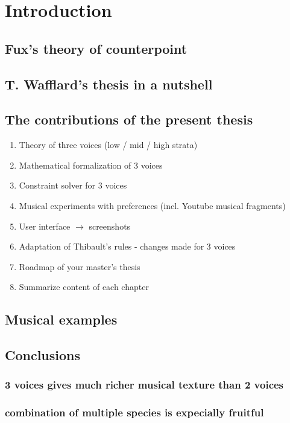 \chapter{Introduction}
\section{Fux's theory of counterpoint}
\section{T. Wafflard's thesis in a nutshell}
\section{The contributions of the present thesis}
\begin{enumerate}
    \item Theory of three voices (low / mid / high strata)
    \item Mathematical formalization of 3 voices
    \item Constraint solver for 3 voices
    \item Musical experiments with preferences (incl. Youtube musical fragments)
    \item User interface $\rightarrow$ screenshots
    \item Adaptation of Thibault's rules - changes made for 3 voices
    \item Roadmap of your master's thesis
    \item Summarize content of each chapter
\end{enumerate}
\section{Musical examples}
\section{Conclusions}
\subsection*{3 voices gives much richer musical texture than 2 voices}
\subsection*{combination of multiple species is expecially fruitful}
